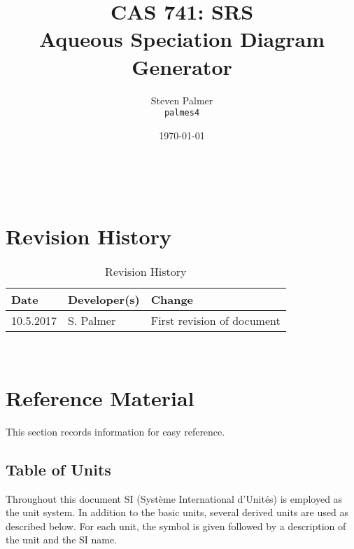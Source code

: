 \documentclass[12pt]{article}
\begin{document}

\title{CAS 741: SRS\\[10pt]\Large Aqueous Speciation Diagram Generator}
\author{Steven Palmer\\\texttt{palmes4}}
\date{\today}
	
\maketitle

~\newpage


\setcounter{secnumdepth}{0}

\section{Revision History}

\begin{table}[hp]
\caption{Revision History} \label{TblRevisionHistory}
\begin{tabularx}{\textwidth}{llX}
\toprule
\textbf{Date} & \textbf{Developer(s)} & \textbf{Change}\\
\midrule
10.5.2017 & S. Palmer & First revision of document\\
\bottomrule
\end{tabularx}
\end{table}

~\newpage

\section{Reference Material}

This section records information for easy reference.

\subsection{Table of Units}

Throughout this document SI (Syst\`{e}me International d'Unit\'{e}s) is employed 
as the unit system.  In addition to the basic units, several derived units are
used as described below.  For each unit, the symbol is given followed by a
description of the unit and the SI name.
~\newline
\end{document}
